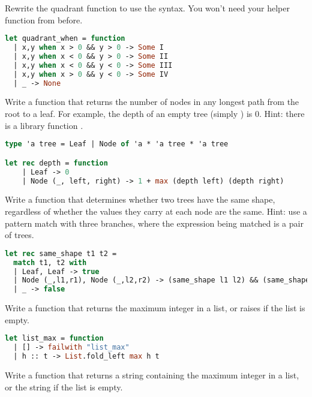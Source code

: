 Rewrite the quadrant function to use the  syntax. You won't need your helper function from before.

\begin{lstlisting}[language=OCaml]
let quadrant_when = function
  | x,y when x > 0 && y > 0 -> Some I
  | x,y when x < 0 && y > 0 -> Some II
  | x,y when x < 0 && y < 0 -> Some III
  | x,y when x > 0 && y < 0 -> Some IV
  | _ -> None
\end{lstlisting}


\problem[depth]
Write a function  that returns the number of nodes in any longest path from the root to a leaf. For example, the depth of an empty tree (simply ) is 0. Hint: there is a library function .

\begin{lstlisting}[language=OCaml]
type 'a tree = Leaf | Node of 'a * 'a tree * 'a tree

let rec depth = function
	| Leaf -> 0
	| Node (_, left, right) -> 1 + max (depth left) (depth right)
\end{lstlisting}


\problem[shape]
Write a function  that determines whether two trees have the same shape, regardless of whether the values they carry at each node are the same. Hint: use a pattern match with three branches, where the expression being matched is a pair of trees.

\begin{lstlisting}[language=OCaml]
let rec same_shape t1 t2 =
  match t1, t2 with
  | Leaf, Leaf -> true
  | Node (_,l1,r1), Node (_,l2,r2) -> (same_shape l1 l2) && (same_shape r1 r2)
  | _ -> false
\end{lstlisting}

Write a function  that returns the maximum integer in a list, or raises  if the list is empty.

\begin{lstlisting}[language=OCaml]
let list_max = function
  | [] -> failwith "list_max"
  | h :: t -> List.fold_left max h t
\end{lstlisting}

Write a function  that returns a string containing the maximum integer in a list, or the string  if the list is empty.

